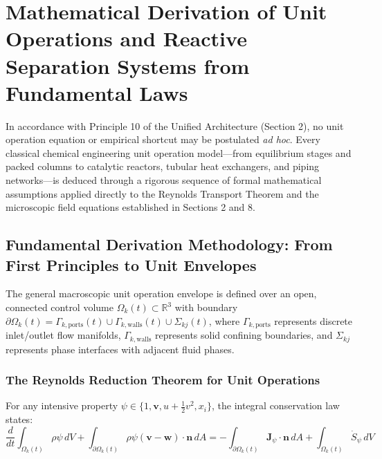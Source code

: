 \documentclass[11pt,a4paper]{article}
\begin{document}
\section{Mathematical Derivation of Unit Operations and Reactive Separation Systems from Fundamental Laws}

In accordance with Principle 10 of the Unified Architecture (Section 2), no unit operation equation or empirical shortcut may be postulated \textit{ad hoc}. Every classical chemical engineering unit operation model---from equilibrium stages and packed columns to catalytic reactors, tubular heat exchangers, and piping networks---is deduced through a rigorous sequence of formal mathematical assumptions applied directly to the Reynolds Transport Theorem and the microscopic field equations established in Sections 2 and 8.

\subsection{Fundamental Derivation Methodology: From First Principles to Unit Envelopes}

The general macroscopic unit operation envelope is defined over an open, connected control volume $\Omega_k(t) \subset \mathbb{R}^3$ with boundary $\partial \Omega_k(t) = \Gamma_{k,\text{ports}}(t) \cup \Gamma_{k,\text{walls}}(t) \cup \Sigma_{kj}(t)$, where $\Gamma_{k,\text{ports}}$ represents discrete inlet/outlet flow manifolds, $\Gamma_{k,\text{walls}}$ represents solid confining boundaries, and $\Sigma_{kj}$ represents phase interfaces with adjacent fluid phases.

\subsubsection{The Reynolds Reduction Theorem for Unit Operations}
For any intensive property $\psi \in \{1, \mathbf{v}, u + \frac{1}{2}v^2, x_i\}$, the integral conservation law states:
\begin{equation}
\frac{d}{dt} \int_{\Omega_k(t)} \rho \psi \, dV + \int_{\partial \Omega_k(t)} \rho \psi (\mathbf{v} - \mathbf{w}) \cdot \mathbf{n} \, dA = -\int_{\partial \Omega_k(t)} \mathbf{J}_\psi \cdot \mathbf{n} \, dA + \int_{\Omega_k(t)} \dot{S}_\psi \, dV
\end{equation}
\end{document}
